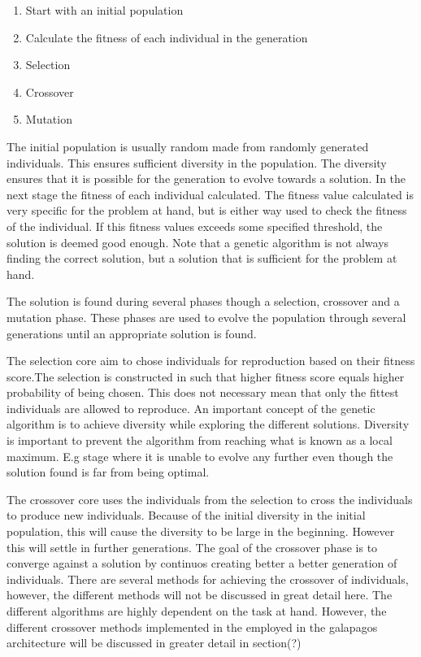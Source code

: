 \begin{enumerate}
    \item Start with an initial population
    \item Calculate the fitness of each individual in the generation
    \item Selection
    \item Crossover
    \item Mutation  
\end{enumerate}

The initial population is usually random made from randomly generated individuals. This ensures sufficient diversity in the population. The diversity ensures that it is possible for the generation to evolve towards a solution. In the next stage the fitness of each individual calculated. The fitness value calculated is very specific for the problem at hand, but is either way used to check the fitness of the individual. If this fitness values exceeds some specified threshold, the solution is deemed good enough. Note that a genetic algorithm is not always finding the correct solution, but a solution that is sufficient for the problem at hand.

The solution is found during several phases though a selection, crossover and a mutation phase. 
These phases are used to evolve the population through several generations until an appropriate 
solution is found. 

The selection core aim to chose individuals for reproduction based on their fitness score.The selection is constructed in such that higher fitness score equals higher probability of being chosen. This does not necessary mean that only the fittest individuals are allowed to reproduce. An important concept of the genetic algorithm is to achieve diversity while exploring the different solutions. Diversity is important to prevent the algorithm from reaching what is known as a local maximum. E.g stage where it is unable to evolve any further even though the solution found is far from being optimal.

The crossover core uses the individuals from the selection to cross the individuals to produce new individuals. Because of the initial diversity in the initial population, this will cause the diversity to be large in the beginning. However this will settle in further generations. The goal of the crossover phase is to converge against a solution by continuos creating better a better generation of individuals. There are several methods for achieving the crossover of individuals, however, the different methods will not be discussed in great detail here. The different algorithms are highly dependent on the task at hand. However, the different crossover methods implemented in the employed in the galapagos architecture will be discussed in greater detail in section(?) 

